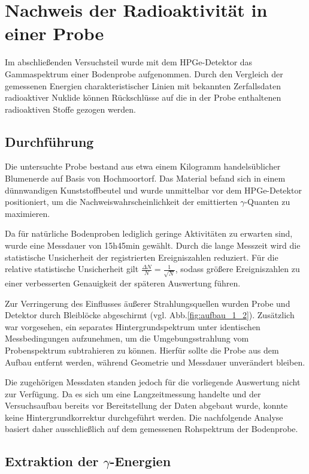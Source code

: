 \chapter{Nachweis der Radioaktivität in einer Probe}

Im abschließenden Versuchsteil wurde mit dem HPGe-Detektor das Gammaspektrum einer Bodenprobe aufgenommen. 
Durch den Vergleich der gemessenen Energien charakteristischer Linien mit bekannten Zerfallsdaten radioaktiver Nuklide können Rückschlüsse auf die in der Probe enthaltenen radioaktiven Stoffe gezogen werden.

\section{Durchführung}

Die untersuchte Probe bestand aus etwa einem Kilogramm handelsüblicher Blumenerde auf Basis von Hochmoortorf. 
Das Material befand sich in einem dünnwandigen Kunststoffbeutel und wurde unmittelbar vor dem HPGe-Detektor positioniert, um die Nachweiswahrscheinlichkeit der emittierten $\gamma$-Quanten zu maximieren.

Da für natürliche Bodenproben lediglich geringe Aktivitäten zu erwarten sind, wurde eine Messdauer von 15h45min gewählt. 
Durch die lange Messzeit wird die statistische Unsicherheit der registrierten Ereigniszahlen reduziert. 
Für die relative statistische Unsicherheit gilt $\frac{\Delta N}{N}=\frac{1}{\sqrt{N}}$,
sodass größere Ereigniszahlen zu einer verbesserten Genauigkeit der späteren Auswertung führen.

Zur Verringerung des Einflusses äußerer Strahlungsquellen wurden Probe und Detektor durch Bleiblöcke abgeschirmt (vgl. Abb.\ref{fig:aufbau_1_2}). 
Zusätzlich war vorgesehen, ein separates Hintergrundspektrum unter identischen Messbedingungen aufzunehmen, um die Umgebungsstrahlung vom Probenspektrum subtrahieren zu können. 
Hierfür sollte die Probe aus dem Aufbau entfernt werden, während Geometrie und Messdauer unverändert bleiben.

Die zugehörigen Messdaten standen jedoch für die vorliegende Auswertung nicht zur Verfügung. 
Da es sich um eine Langzeitmessung handelte und der Versuchsaufbau bereits vor Bereitstellung der Daten abgebaut wurde, konnte keine Hintergrundkorrektur durchgeführt werden. 
Die nachfolgende Analyse basiert daher ausschließlich auf dem gemessenen Rohspektrum der Bodenprobe.


\section{Extraktion der $\gamma$-Energien}

